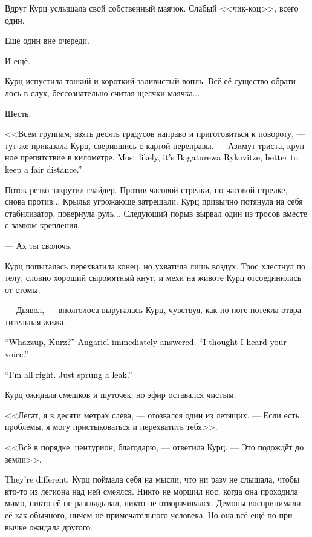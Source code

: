 \documentclass[a4paper,12pt,fleqn]{book}\usepackage{cooltooltips}\usepackage{polyglossia}\setdefaultlanguage[babelshorthands=true]{russian}\setotherlanguage{english}\defaultfontfeatures{Ligatures=TeX,Mapping=tex-text} \usepackage{xcolor}\definecolor{lightgray}{HTML}{bbbbbb}\color{lightgray}\newcommand{\ml}[3]{\textenglish{\textcolor{black}{#3}}}
\begin{document}
Вдруг Курц услышала свой собственный маячок.
Слабый <<чик-коц>>, всего один.

Ещё один вне очереди.

И ещё.

Курц испустила тонкий и короткий заливистый вопль.
Всё её существо обратилось в слух, бессознательно считая щелчки маячка...

Шесть.

<<Всем группам, взять десять градусов направо и приготовиться к повороту, --- тут же приказала Курц, сверившись с картой переправы.
--- Азимут триста, крупное препятствие в километре.
\ml{$0$}
{Скорее всего, это Багатурева Рыковице, от неё лучше держаться подальше>>.}
{Most likely, it's Bagaturewa Rykovitze, better to keep a fair distance.''}

Поток резко закрутил глайдер.
Против часовой стрелки, по часовой стрелке, снова против...
Крылья угрожающе затрещали.
Курц привычно потянула на себя стабилизатор, повернула руль...
Следующий порыв вырвал один из тросов вместе с замком крепления.

--- Ах ты сволочь.

Курц попыталась перехватила конец, но ухватила лишь воздух.
Трос хлестнул по телу, словно хороший сыромятный кнут, и мехи на животе Курц отсоединились от стомы.

--- Дьявол, --- вполголоса выругалась Курц, чувствуя, как по ноге потекла отвратительная жижа.

\ml{$0$}
{<<Что такое, Курц? --- тут же отозвалась Ангарьель.}
{``Whazzup, Kurz?'' Angariel immediately answered.}
\ml{$0$}
{--- Мне послышался твой голос>>.}
{``I thought I heard your voice.''}

\ml{$0$}
{<<Всё нормально.}
{``I'm all right.}
\ml{$0$}
{Я просто немного дала течь>>.}
{Just sprung a leak.''}

Курц ожидала смешков и шуточек, но эфир оставался чистым.

<<Легат, я в десяти метрах слева, --- отозвался один из летящих.
--- Если есть проблемы, я могу пристыковаться и перехватить тебя>>.

<<Всё в порядке, центурион, благодарю, --- ответила Курц.
--- Это подождёт до земли>>.

\ml{$0$}
{<<Они другие>>.}
{They're different.}
Курц поймала себя на мысли, что ни разу не слышала, чтобы кто-то из легиона над ней смеялся.
Никто не морщил нос, когда она проходила мимо, никто её не разглядывал, никто не отворачивался.
Демоны воспринимали её как обычного, ничем не примечательного человека.
Но она всё ещё по привычке ожидала другого.
\end{document}
